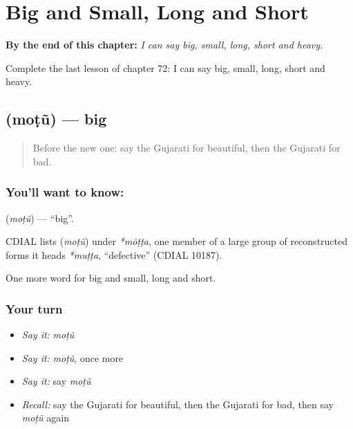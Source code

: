 
\chapter{Big and Small, Long and Short}
\label{ch:gu-big-and-small-long-and-short}

\begin{chapteropening}
\textbf{By the end of this chapter:} \emph{I can say big, small, long, short and heavy.}

Complete the last lesson of chapter 72: I can say big, small, long, short and heavy.
\end{chapteropening}

\section[\texorpdfstring{\gu{મોટું} (moṭũ)}{મોટું (moṭũ)}]{ (moṭũ) — big}

\label{lesson:GU-C72-big}



\begin{quote}
Before the new one: say the Gujarati for beautiful, then the Gujarati for bad.
\end{quote}

\subsection*{You'll want to know: }
\textbf{} (\emph{moṭũ}) — \textquotedblleft{}big\textquotedblright{}.

\begin{cousinweb}
CDIAL lists \textbf{} (\emph{moṭũ}) under \emph{*mōṭṭa}, one member of a large group of reconstructed forms it heads \emph{*muṭṭa}, \textquotedblleft{}defective\textquotedblright{} (CDIAL 10187).
\end{cousinweb}

\begin{grammarlens}[title={What you've built}]
One more word for big and small, long and short.
\end{grammarlens}

\subsection*{Your turn}
\begin{itemize}
\raggedright
  \item \emph{Say it:} \emph{moṭũ}
  \item \emph{Say it:} \emph{moṭũ}, once more
  \item \emph{Say it:} say \emph{moṭũ}
  \item \emph{Recall:} say the Gujarati for beautiful, then the Gujarati for bad, then say \emph{moṭũ} again
\end{itemize}

